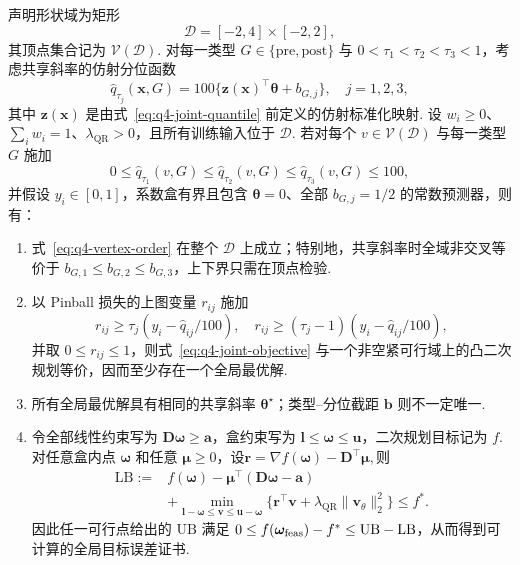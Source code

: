 \begin{theorem}[有序联合分位规划的全域形状与全局可解性]\label{thm:q4-ordered-quantile-qp}
声明形状域为矩形
\[
\mathcal D=[-2,4]\times[-2,2],
\]
其顶点集合记为 $\mathcal V(\mathcal D)$. 对每一类型 $G\in\{\mathrm{pre},\mathrm{post}\}$ 与
$0<\tau_1<\tau_2<\tau_3<1$，考虑共享斜率的仿射分位函数
\[
\widehat q_{\tau_j}(\boldsymbol x,G)
=100\{\boldsymbol z(\boldsymbol x)^\top\boldsymbol\theta+b_{G,j}\},
\quad j=1,2,3,
\]
其中 $\boldsymbol z(\boldsymbol x)$ 是由式~\eqref{eq:q4-joint-quantile} 前定义的仿射标准化映射. 设
$w_i\ge0$、$\sum_iw_i=1$、$\lambda_{\mathrm{QR}}>0$，且所有训练输入位于 $\mathcal D$. 若对每个
$v\in\mathcal V(\mathcal D)$ 与每一类型 $G$ 施加
\begin{equation}\label{eq:q4-vertex-order}
0\le\widehat q_{\tau_1}(v,G)
\le\widehat q_{\tau_2}(v,G)
\le\widehat q_{\tau_3}(v,G)\le100,
\end{equation}
并假设 $y_i\in[0,1]$，系数盒有界且包含 $\boldsymbol\theta=0$、全部 $b_{G,j}=1/2$ 的常数预测器，则有：
\begin{enumerate}
\renewcommand{\labelenumi}{(\roman{enumi})}

\item 式~\eqref{eq:q4-vertex-order} 在整个 $\mathcal D$ 上成立；特别地，共享斜率时全域非交叉等价于
$b_{G,1}\le b_{G,2}\le b_{G,3}$，上下界只需在顶点检验. 
\item 以 Pinball 损失的上图变量 $r_{ij}$ 施加
\[
r_{ij}\ge\tau_j(y_i-\widehat q_{ij}/100),\quad
r_{ij}\ge(\tau_j-1)(y_i-\widehat q_{ij}/100),
\]
并取 $0\le r_{ij}\le1$，则式~\eqref{eq:q4-joint-objective} 与一个非空紧可行域上的凸二次规划等价，因而至少存在一个全局最优解. 
\item 所有全局最优解具有相同的共享斜率 $\boldsymbol\theta^\star$；类型--分位截距
$\boldsymbol b$ 则不一定唯一. 
\item 令全部线性约束写为 $\mathbf D\boldsymbol\omega\ge\boldsymbol a$，盒约束写为
$\boldsymbol l\le\boldsymbol\omega\le\boldsymbol u$，二次规划目标记为 $f$. 对任意盒内点
$\boldsymbol\omega$ 和任意 $\boldsymbol\mu\ge0$，设$\boldsymbol r=\nabla f(\boldsymbol\omega)-\mathbf D^\top\boldsymbol\mu,$则
\begin{equation}\label{eq:q4-qp-lower}
\begin{aligned}
\mathrm{LB}:={}&f(\boldsymbol\omega)
-\boldsymbol\mu^\top(\mathbf D\boldsymbol\omega-\boldsymbol a)\\
&+\min_{\boldsymbol l-\boldsymbol\omega\le\boldsymbol v\le
\boldsymbol u-\boldsymbol\omega}
\{\boldsymbol r^\top\boldsymbol v+\lambda_{\mathrm{QR}}\|\boldsymbol v_\theta\|_2^2\}
\le f^*.
\end{aligned}
\end{equation}
因此任一可行点给出的 $\mathrm{UB}$ 满足
$0\le f(\boldsymbol\omega_{\rm feas})-f^*\le\mathrm{UB}-\mathrm{LB}$，从而得到可计算的全局目标误差证书. 
\end{enumerate}

\end{theorem}
